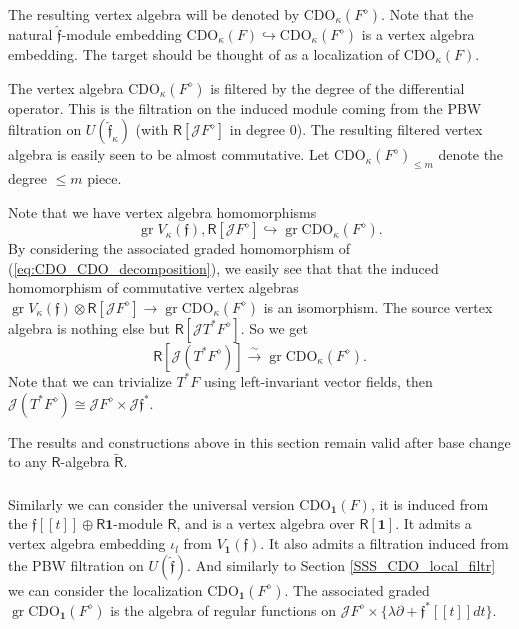 \documentclass{amsart}
\theoremstyle{definition}
\newcommand{\sss}{\subsubsection{}}
\newcommand{\Ring}{\mathsf{R}}
\newcommand{\gr}{\operatorname{gr}}
\newcommand{\Jet}{\mathscr{J}}
\newcommand{\ff}{\mathfrak{f}}
\newcommand{\CDO}{\mathrm{CDO}}
\newcommand{\bone}{\mathbf{1}}
\numberwithin{equation}{section}
\begin{document}
The resulting vertex algebra will be denoted by $\CDO_\kappa(F^\diamond)$. Note that the natural $\hat{\mathfrak{f}}$-module embedding $\CDO_\kappa(F)\hookrightarrow\CDO_\kappa(F^\diamond)$ is a vertex algebra embedding. The target should be thought of as a localization of $\CDO_\kappa(F)$.

The vertex algebra $\CDO_\kappa(F^\diamond)$ is filtered by the degree of the differential operator. This  is the filtration on the induced module coming from the PBW filtration on $U(\hat{\mathfrak{f}}_\kappa)$ (with $\Ring[\Jet F^\diamond]$ in degree $0$). The resulting filtered vertex algebra is easily seen to be almost commutative. Let $\CDO_\kappa(F^\diamond)_{\leqslant m}$ denote the degree $\leqslant m$ piece. 

Note that we have vertex algebra homomorphisms $$\operatorname{gr}V_\kappa(\ff), \Ring[\Jet F^\diamond]\hookrightarrow \gr \CDO_\kappa(F^\diamond).$$ 
By considering the associated graded homomorphism of (\ref{eq:CDO_CDO_decomposition}), we easily see that 
that the induced homomorphism of commutative vertex algebras $\operatorname{gr}V_\kappa(\ff)\otimes \Ring[\Jet F^\diamond]\rightarrow \operatorname{gr}\CDO_\kappa(F^\diamond)$ is an isomorphism. The source vertex algebra is nothing else but $\Ring[\Jet T^*F^\diamond]$. So we get 
\begin{equation}\label{eq:gr_CDO}
\Ring[\Jet(T^*F^\diamond)]\xrightarrow{\sim} \gr \CDO_\kappa(F^\diamond). 
\end{equation}
Note that we can trivialize $T^*F$ using left-invariant vector fields, then $\Jet(T^*F^\diamond)\cong \Jet F^\diamond\times \Jet \ff^*$.

The results and constructions above in this section remain valid after base change to any $\Ring$-algebra $\tilde{\Ring}$.

\sss\label{SSS_CDO_universal}
Similarly we can consider the universal version 
$\CDO_{\bone}(F)$, it is induced from the $\ff[[t]]\oplus \Ring\mathbf{1}$-module $\Ring$, and is a vertex algebra over $\Ring[\mathbf{1}]$. It admits a vertex algebra embedding $\iota_l$ from $V_{\bone}(\ff)$. It also admits a filtration induced from the PBW filtration on $U(\hat{\ff})$. 
And similarly to Section \ref{SSS_CDO_local_filtr} we can consider the localization $\CDO_{\bone}(F^\diamond)$.
The associated graded $\gr \CDO_{\bone}(F^\diamond)$ is the algebra of regular functions on $\Jet F^\diamond\times \{\lambda\partial+\ff^*[[t]]dt\}$. 
\end{document}
